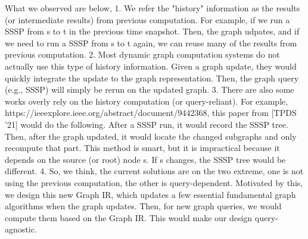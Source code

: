 What we observed are below,
1. We refer the "history" information as the results (or intermediate results) from previous computation. For example, if we run a SSSP from s to t in the previous time snapshot. Then, the graph udpates, and if we need to run a SSSP from s to t again, we can reuse many of the results from previous computation.
2. Most dynamic graph computation systems do not actually use this type of history information. Given a graph update, they would quickly integrate the update to the graph representation. Then, the graph query (e.g., SSSP) will simply be rerun on the updated graph.
3. There are also some works overly rely on the history computation (or query-reliant). For example, https://ieeexplore.ieee.org/abstract/document/9442368, this paper from [TPDS '21] would do the following. After a SSSP run, it would record the SSSP tree. Then, after the graph updated, it would locate the changed subgraphs and only recompute that part. This method is smart, but it is impractical because it depends on the source (or root) node s. If s changes, the SSSP tree would be different.
4. So, we think, the current solutions are on the two extreme, one is not using the previous computation, the other is query-dependent. Motivated by this, we design this new Graph IR, which updates a few essential fundamental graph algorithms when the graph updates. Then, for new graph queries, we would compute them based on the Graph IR. This would make our design query-agnostic.